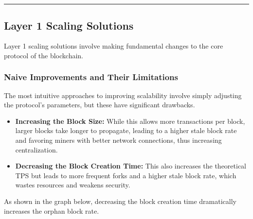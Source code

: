 \begin{center}\rule{0.5\linewidth}{0.5pt}\end{center}

\subsection{Layer 1 Scaling
Solutions}\label{section-3-layer-1-scaling-solutions}

Layer 1 scaling solutions involve making fundamental changes to the core
protocol of the blockchain.

\subsubsection{Naive Improvements and Their
Limitations}\label{naive-improvements-and-their-limitations}

The most intuitive approaches to improving scalability involve simply
adjusting the protocol's parameters, but these have significant
drawbacks.

\begin{itemize}
\item
  \textbf{Increasing the Block Size:} While this allows more
  transactions per block, larger blocks take longer to propagate,
  leading to a higher stale block rate and favoring miners with better
  network connections, thus increasing centralization.

\item
  \textbf{Decreasing the Block Creation Time:} This also increases the
  theoretical TPS but leads to more frequent forks and a higher stale
  block rate, which wastes resources and weakens security.

\end{itemize}

As shown in the graph below, decreasing the block creation time
dramatically increases the orphan block rate.

